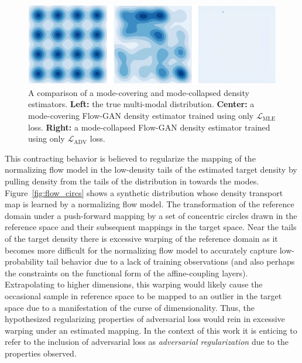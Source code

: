 \begin{figure}[htbp]
    \caption[Mode-covering and mode-collapsed density estimators on 2-d synthetic data]{
        A comparison of a mode-covering and mode-collapsed density estimators.
        \textbf{Left:} the true multi-modal distribution.
        \textbf{Center:} a mode-covering Flow-GAN density estimator trained using only $\mathcal{L}_{\text{MLE}}$ loss.
        \textbf{Right:} a mode-collapsed Flow-GAN density estimator trained using only $\mathcal{L}_{\text{ADV}}$ loss.
    }
    \begin{center}
        \setlength{\fboxsep}{0pt}%
        \setlength{\fboxrule}{1pt}%
        \includegraphics[width=120mm]{figs/mode-collapse}
    \end{center}
    \label{fig:mode_collapse}
\end{figure}

This contracting behavior is believed to regularize the mapping of the normalizing flow model in the low-density tails
of the estimated target density by pulling density from the tails of the distribution in towards the modes.
Figure~\ref{fig:flow_circs} shows a synthetic distribution whose density transport map is learned by a normalizing flow model.
The transformation of the reference domain under a push-forward mapping by a set of concentric circles drawn in the
reference space and their subsequent mappings in the target space.
Near the tails of the target density there is excessive warping of the reference domain as it becomes more
difficult for the normalizing flow model to accurately capture low-probability tail behavior due to a lack of training
observations (and also perhaps the constraints on the functional form of the affine-coupling layers).
Extrapolating to higher dimensions, this warping would likely cause the occasional sample in reference space to be
mapped to an outlier in the target space due to a manifestation of the curse of dimensionality.
Thus, the hypothesized regularizing properties of adversarial loss would rein in excessive warping under an
estimated mapping.
In the context of this work it is enticing to refer to the inclusion of adversarial loss as \textit{adversarial
regularization} due to the properties observed.

